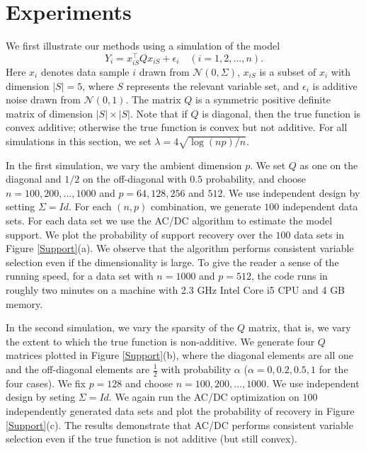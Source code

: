\def\x{x}
\def\Q{Q}
\def\bds#1{#1}
\def\tts#1{\texttt{\small #1}}

\section{Experiments}
\label{sec:thesims}
We first illustrate our methods using a simulation of the model
\begin{equation}\nonumber
         Y_i = \x_{iS}^{\top}\Q\x_{iS} + \epsilon_i \quad (i=1,2,\ldots,n).
\end{equation}
Here $\x_{i}$ denotes data sample $i$ drawn from $\mathcal{N}(\bds{0}, \Sigma)$, 
$\x_{iS}$ is a subset of $\x_i$ with dimension $|S|=5$, where $S$
represents the relevant variable set, and 
$\epsilon_i$ is additive noise drawn from $\mathcal{N}(0,1)$. 
The matrix $\Q$ is a symmetric positive definite matrix of dimension $|S|\times{}|S|$. 
Note that if $\Q$ is diagonal, then the true function is convex
additive; 
otherwise the true function is convex but not additive.
For all simulations in this section, we set $\lambda=4\sqrt{{\log(np)}/{n}}$.

In the first simulation, we vary the ambient dimension $p$. We set $Q$ as one on the diagonal and $1/2$ on the off-diagonal with $0.5$ probability, and choose $n=100, 200,\ldots,1000$ and $p=64,128,256$ and $512$. We use independent design by setting $\Sigma = Id$.
For each $(n,p)$ combination, we generate $100$ independent data
sets. For each data set we use the AC/DC algorithm to estimate the model support.
We plot the probability of
support recovery over the $100$ data sets in Figure \ref{Support}(a).  We
observe that the algorithm performs consistent variable selection even if the dimensionality is large. To give the reader a
sense of the running speed, for a 
data set with $n=1000$ and $p=512$, the code runs in roughly two 
minutes on a machine with 2.3 GHz Intel Core i5 CPU and 4 GB memory.

In the second simulation, we vary the sparsity of the $Q$ matrix, that is, we vary the extent to which the true function is non-additive. We generate four $\Q$ matrices
plotted in Figure \ref{Support}(b), where the diagonal elements are all one and
the off-diagonal elements are $\frac{1}{2}$ with probability $\alpha$
($\alpha=0,0.2,0.5,1$ for the four cases). We fix $p=128$ and choose
$n=100,200,\ldots,1000$. We use independent design by seting $\Sigma = Id$. We again run the AC/DC optimization on $100$
independently generated data sets and plot the probability of recovery
in Figure \ref{Support}(c). The results demonstrate that AC/DC performs
consistent variable selection even if the true function is not additive (but
still convex).

